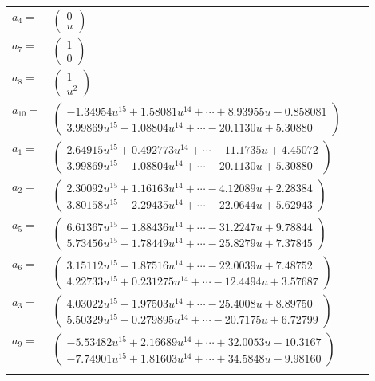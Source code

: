 \documentclass[1p]{elsarticle_modified}
\theoremstyle{definition}
\begin{document}
\begin{tabular}{m{7pt} m{180pt} m{7pt} m{180pt} }
\flushright $a_{4}=$&$\begin{pmatrix}0\\u\end{pmatrix}$ \\
\flushright $a_{7}=$&$\begin{pmatrix}1\\0\end{pmatrix}$ \\
\flushright $a_{8}=$&$\begin{pmatrix}1\\u^2\end{pmatrix}$ \\
\flushright $a_{10}=$&$\begin{pmatrix}-1.34954 u^{15}+1.58081 u^{14}+\cdots+8.93955 u-0.858081\\3.99869 u^{15}-1.08804 u^{14}+\cdots-20.1130 u+5.30880\end{pmatrix}$ \\
\flushright $a_{1}=$&$\begin{pmatrix}2.64915 u^{15}+0.492773 u^{14}+\cdots-11.1735 u+4.45072\\3.99869 u^{15}-1.08804 u^{14}+\cdots-20.1130 u+5.30880\end{pmatrix}$ \\
\flushright $a_{2}=$&$\begin{pmatrix}2.30092 u^{15}+1.16163 u^{14}+\cdots-4.12089 u+2.28384\\3.80158 u^{15}-2.29435 u^{14}+\cdots-22.0644 u+5.62943\end{pmatrix}$ \\
\flushright $a_{5}=$&$\begin{pmatrix}6.61367 u^{15}-1.88436 u^{14}+\cdots-31.2247 u+9.78844\\5.73456 u^{15}-1.78449 u^{14}+\cdots-25.8279 u+7.37845\end{pmatrix}$ \\
\flushright $a_{6}=$&$\begin{pmatrix}3.15112 u^{15}-1.87516 u^{14}+\cdots-22.0039 u+7.48752\\4.22733 u^{15}+0.231275 u^{14}+\cdots-12.4494 u+3.57687\end{pmatrix}$ \\
\flushright $a_{3}=$&$\begin{pmatrix}4.03022 u^{15}-1.97503 u^{14}+\cdots-25.4008 u+8.89750\\5.50329 u^{15}-0.279895 u^{14}+\cdots-20.7175 u+6.72799\end{pmatrix}$ \\
\flushright $a_{9}=$&$\begin{pmatrix}-5.53482 u^{15}+2.16689 u^{14}+\cdots+32.0053 u-10.3167\\-7.74901 u^{15}+1.81603 u^{14}+\cdots+34.5848 u-9.98160\end{pmatrix}$\\&\end{tabular}
\end{document}
